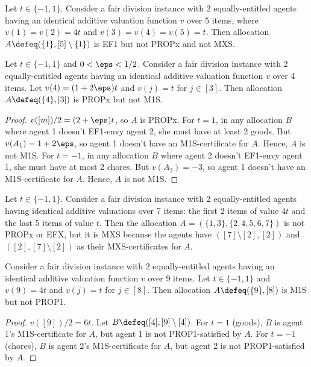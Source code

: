 \begin{example}
\label{cex:ef1-not-propx-mxs}
Let $t \in \{-1, 1\}$.
Consider a fair division instance with 2 equally-entitled agents
having an identical additive valuation function $v$ over 5 items,
where $v(1) = v(2) = 4t$ and $v(3) = v(4) = v(5) = t$.
Then allocation $A \defeq (\{1\}, [5] \setminus \{1\})$ is EF1 but not PROPx and not MXS.
\end{example}

\begin{lemma}
\label{cex:propx-not-m1s}
Let $t \in \{-1, 1\}$ and $0 < \eps < 1/2$.
Consider a fair division instance with 2 equally-entitled agents having
an identical additive valuation function $v$ over 4 items.
Let $v(4) = (1+2\eps)t$ and $v(j) = t$ for $j \in [3]$.
Then allocation $A \defeq (\{4\}, [3])$ is PROPx but not M1S.
\end{lemma}
\begin{proof}
$v([m])/2 = (2+\eps)t$, so $A$ is PROPx.
%
For $t = 1$, in any allocation $B$ where agent 1 doesn't EF1-envy agent 2, she must have at least 2 goods.
But $v(A_1) = 1+2\eps$, so agent 1 doesn't have an M1S-certificate for $A$. Hence, $A$ is not M1S.
%
For $t = -1$, in any allocation $B$ where agent 2 doesn't EF1-envy agent 1, she must have at most 2 chores.
But $v(A_2) = -3$, so agent 1 doesn't have an M1S-certificate for $A$. Hence, $A$ is not M1S.
\end{proof}

\begin{example}[MXS $\nfimplies$ PROPx for $n=2$, \cite{caragiannis2022existence}]
\label{cex:mxs-not-propx-n2}
Let $t \in \{-1, 1\}$.
Consider a fair division instance with 2 equally-entitled agents
having identical additive valuations over 7 items:
the first 2 items of value $4t$ and the last 5 items of value $t$.
Then the allocation $A = (\{1, 3\}, \{2, 4, 5, 6, 7\})$ is not PROPx or EFX,
but it is MXS because the agents have $([7] \setminus [2], [2])$
and $([2], [7] \setminus [2])$ as their MXS-certificates for $A$.
\end{example}

\begin{lemma}
\label{cex:m1s-not-prop1}
Consider a fair division instance with 2 equally-entitled agents
having an identical additive valuation function $v$ over 9 items.
Let $t \in \{-1, 1\}$ and $v(9) = 4t$ and $v(j) = t$ for $j \in [8]$.
Then allocation $A \defeq (\{9\}, [8])$ is M1S but not PROP1.
\end{lemma}
\begin{proof}
$v([9])/2 = 6t$. Let $B \defeq ([4], [9] \setminus [4])$.
%
For $t = 1$ (goods), $B$ is agent 1's M1S-certificate for $A$,
but agent 1 is not PROP1-satisfied by $A$.
%
For $t = -1$ (chores), $B$ is agent 2's M1S-certificate for $A$,
but agent 2 is not PROP1-satisfied by $A$.
\end{proof}

